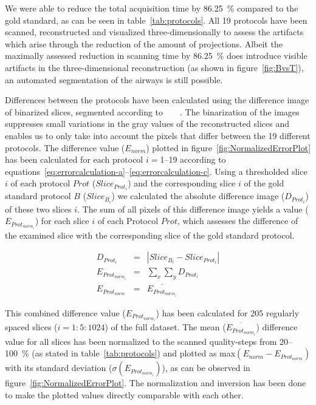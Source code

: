 We were able to reduce the total acquisition time by \SI{86.25}{\percent} compared to the gold standard, as can be seen in table~\ref{tab:protocols}. All 19 protocols have been scanned, reconstructed and visualized three-dimensionally to assess the artifacts which arise through the reduction of the amount of projections. Albeit the maximally assessed reduction in scanning time by \SI{86.25}{\percent} does introduce visible artifacts in the three-dimensional reconstruction (as shown in figure~\ref{fig:BvsT}), an automated segmentation of the airways is still possible.

Differences between the protocols have been calculated using the difference image of binarized slices, segmented according to%
\ifhtml
	~\citet{Otsu1979}
\else
	~
\fi%
. The binarization of the images suppresses small variations in the gray values of the reconstructed slices and enables us to only take into account the pixels that differ between the 19 different protocols. The difference value ($E_{norm}$) plotted in figure~\ref{fig:NormalizedErrorPlot} has been calculated for each protocol $i=$1--19 according to equations~\ref{eq:errorcalculation-a}--\ref{eq:errorcalculation-c}. Using a thresholded slice $i$ of each protocol $Prot$ ($Slice_{Prot_{i}}$) and the corresponding slice $i$ of the gold standard protocol $B$ ($Slice_{B_{i}}$) we calculated the absolute difference image ($D_{Prot_{i}}$) of these two slices $i$. The sum of all pixels of this difference image yields a value ($E_{Prot_{norm_{i}}}$) for each slice $i$ of each Protocol $Prot$, which assesses the difference of the examined slice with the corresponding slice of the gold standard protocol. 

\begin{eqnarray}%
	D_{Prot_{i}} &=& |Slice_{B_{i}}-Slice_{Prot_{i}}|\label{eq:errorcalculation-a}\\%
	E_{Prot_{norm_{i}}} &=& \sum_{x}\sum_{y} D_{Prot_{i}}\label{eq:errorcalculation-b}\\%
    E_{Prot_{norm}} &=& \overline{E_{Prot_{norm_{i}}}}\label{eq:errorcalculation-c}%
\end{eqnarray}%

This combined difference value ($E_{Prot_{norm_{i}}}$) has been calculated for 205 regularly spaced slices ($i=1:5:1024$) of the full dataset. The mean ($\overline{E_{Prot_{norm_{i}}}}$) difference value for all slices has been normalized to the scanned quality-steps from 20--\SI{100}{\percent} (as stated in table~\ref{tab:protocols}) and plotted as max$(E_{norm}-E_{Prot_{norm}})$ with its standard deviation ($\sigma(E_{Prot_{norm_{i}}})$), as can be observed in figure~\ref{fig:NormalizedErrorPlot}. The normalization and inversion has been done to make the plotted values directly comparable with each other.

